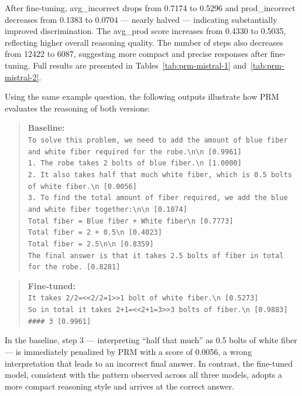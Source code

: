   After fine-tuning, avg\_incorrect drops from
  0.7174 to 0.5296 and prod\_incorrect decreases
  from 0.1383 to 0.0704 --- nearly halved ---
  indicating substantially improved discrimination.
  The avg\_prod score increases from 0.4330 to
  0.5035, reflecting higher overall reasoning
  quality. The number of steps also decreases from
  12422 to 6087, suggesting more compact and
  precise responses after fine-tuning. Full results are presented in
  Tables~\ref{tab:prm-mistral-1}
  and~\ref{tab:prm-mistral-2}.

  Using the same example question, the following
  outputs illustrate how PRM evaluates the
  reasoning of both versions:
  \begin{quote}
  \textbf{Baseline:}\\
  \texttt{To solve this problem, we need to add
  the amount of blue fiber and white fiber required
  for the robe.\textbackslash n\textbackslash n [0.9961]\\
  1. The robe takes 2 bolts of blue
  fiber.\textbackslash n [1.0000]\\
  2. It also takes half that much white fiber,
  which is 0.5 bolts of white
  fiber.\textbackslash n [0.0056]\\
  3. To find the total amount of fiber required,
  we add the blue and white fiber
  together:\textbackslash n\textbackslash n [0.1074]\\
  Total fiber = Blue fiber + White
  fiber\textbackslash n [0.7773]\\
  Total fiber = 2 + 0.5\textbackslash n [0.4023]\\
  Total fiber = 2.5\textbackslash n\textbackslash n [0.8359]\\
  The final answer is that it takes 2.5 bolts of
  fiber in total for the robe. [0.8281]}
  \end{quote}

  \begin{quote}
  \textbf{Fine-tuned:}\\
  \texttt{It takes 2/2=<<2/2=1>>1 bolt of white
  fiber.\textbackslash n [0.5273]\\
  So in total it takes 2+1=<<2+1=3>>3 bolts of
  fiber.\textbackslash n [0.9883]\\
  \#\#\#\# 3 [0.9961]}
  \end{quote}

In the baseline, step 3 --- interpreting
  ``half that much'' as 0.5 bolts of white fiber
  --- is immediately penalized by PRM with a score
  of 0.0056, a wrong interpretation that leads to
  an incorrect final answer. In contrast, the
  fine-tuned model, consistent with the pattern
  observed across all three models, adopts a more
  compact reasoning style and arrives at the
  correct answer.

